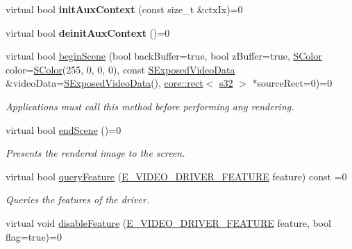 \begin{DoxyCompactItemize}
\item 
virtual bool {\bfseries init\+Aux\+Context} (const size\+\_\+t \&ctx\+Ix)=0\hypertarget{classirr_1_1video_1_1IVideoDriver_a6806af376ade2139e653a1c1c4a912a8}{}\label{classirr_1_1video_1_1IVideoDriver_a6806af376ade2139e653a1c1c4a912a8}

\item 
virtual bool {\bfseries deinit\+Aux\+Context} ()=0\hypertarget{classirr_1_1video_1_1IVideoDriver_a54d1cc3527f786faef44892a86f3ad65}{}\label{classirr_1_1video_1_1IVideoDriver_a54d1cc3527f786faef44892a86f3ad65}

\item 
virtual bool \hyperlink{classirr_1_1video_1_1IVideoDriver_a015b8f2f18c260a00a858181be1e9945}{begin\+Scene} (bool back\+Buffer=true, bool z\+Buffer=true, \hyperlink{classirr_1_1video_1_1SColor}{S\+Color} color=\hyperlink{classirr_1_1video_1_1SColor}{S\+Color}(255, 0, 0, 0), const \hyperlink{structirr_1_1video_1_1SExposedVideoData}{S\+Exposed\+Video\+Data} \&video\+Data=\hyperlink{structirr_1_1video_1_1SExposedVideoData}{S\+Exposed\+Video\+Data}(), \hyperlink{classirr_1_1core_1_1rect}{core\+::rect}$<$ \hyperlink{namespaceirr_ac66849b7a6ed16e30ebede579f9b47c6}{s32} $>$ $\ast$source\+Rect=0)=0
\begin{DoxyCompactList}\small\item\em Applications must call this method before performing any rendering. \end{DoxyCompactList}\item 
virtual bool \hyperlink{classirr_1_1video_1_1IVideoDriver_a75f61a93c5fc9fdf161c044d27bc994e}{end\+Scene} ()=0
\begin{DoxyCompactList}\small\item\em Presents the rendered image to the screen. \end{DoxyCompactList}\item 
virtual bool \hyperlink{classirr_1_1video_1_1IVideoDriver_acf2585c46d032904267887284c6e041c}{query\+Feature} (\hyperlink{namespaceirr_1_1video_a57b1721e42a79c5dcf8e830e3621e08f}{E\+\_\+\+V\+I\+D\+E\+O\+\_\+\+D\+R\+I\+V\+E\+R\+\_\+\+F\+E\+A\+T\+U\+RE} feature) const  =0
\begin{DoxyCompactList}\small\item\em Queries the features of the driver. \end{DoxyCompactList}\item 
virtual void \hyperlink{classirr_1_1video_1_1IVideoDriver_aea64c03fc205f23ec7575884fb7309c8}{disable\+Feature} (\hyperlink{namespaceirr_1_1video_a57b1721e42a79c5dcf8e830e3621e08f}{E\+\_\+\+V\+I\+D\+E\+O\+\_\+\+D\+R\+I\+V\+E\+R\+\_\+\+F\+E\+A\+T\+U\+RE} feature, bool flag=true)=0

\end{DoxyCompactItemize}
